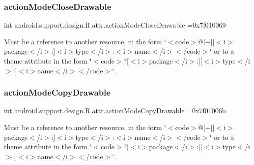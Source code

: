 \subsubsection{\texorpdfstring{action\+Mode\+Close\+Drawable}{actionModeCloseDrawable}}
{\footnotesize\ttfamily int android.\+support.\+design.\+R.\+attr.\+action\+Mode\+Close\+Drawable =0x7f010069\hspace{0.3cm}{\ttfamily [static]}}

Must be a reference to another resource, in the form \char`\"{}$<$code$>$@\mbox{[}+\mbox{]}\mbox{[}$<$i$>$package$<$/i$>$\+:\mbox{]}$<$i$>$type$<$/i$>$\+:$<$i$>$name$<$/i$>$$<$/code$>$\char`\"{} or to a theme attribute in the form \char`\"{}$<$code$>$?\mbox{[}$<$i$>$package$<$/i$>$\+:\mbox{]}\mbox{[}$<$i$>$type$<$/i$>$\+:\mbox{]}$<$i$>$name$<$/i$>$$<$/code$>$\char`\"{}. \mbox{\label{classandroid_1_1support_1_1design_1_1R_1_1attr_ac3f8d06ef8dc101fffba261667ce9abf}} 
\subsubsection{\texorpdfstring{action\+Mode\+Copy\+Drawable}{actionModeCopyDrawable}}
{\footnotesize\ttfamily int android.\+support.\+design.\+R.\+attr.\+action\+Mode\+Copy\+Drawable =0x7f01006b\hspace{0.3cm}{\ttfamily [static]}}

Must be a reference to another resource, in the form \char`\"{}$<$code$>$@\mbox{[}+\mbox{]}\mbox{[}$<$i$>$package$<$/i$>$\+:\mbox{]}$<$i$>$type$<$/i$>$\+:$<$i$>$name$<$/i$>$$<$/code$>$\char`\"{} or to a theme attribute in the form \char`\"{}$<$code$>$?\mbox{[}$<$i$>$package$<$/i$>$\+:\mbox{]}\mbox{[}$<$i$>$type$<$/i$>$\+:\mbox{]}$<$i$>$name$<$/i$>$$<$/code$>$\char`\"{}. \mbox{\label{classandroid_1_1support_1_1design_1_1R_1_1attr_a3b413691753b336a34ebf1925fa20ae7}} 
